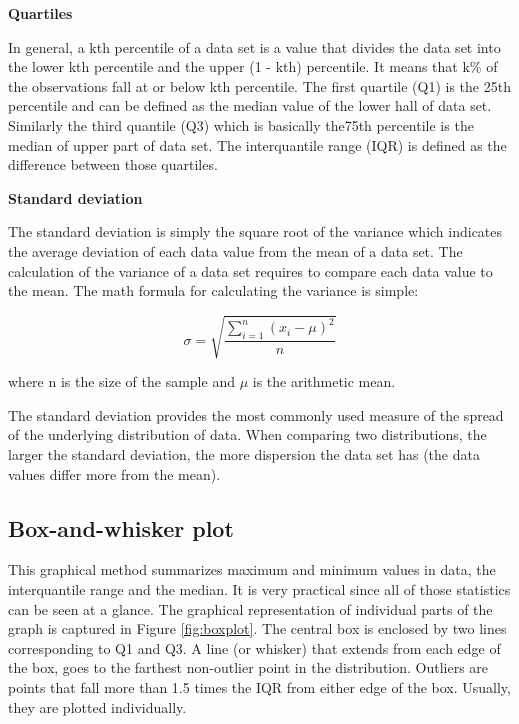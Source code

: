 \documentclass[a4paper,10pt,twoside]{article}
\begin{document}
 \smallskip
\noindent \textbf{Quartiles}
\smallskip

\noindent In general, a kth percentile of a data set is a value that divides the data set into the lower kth percentile and the upper (1 - kth) percentile. It means that k\% of the observations fall at or below kth percentile. The first quartile (Q1) is the 25th percentile and can be defined as the median value of the lower hall of data set. Similarly the third quantile (Q3) which is basically the75th percentile is the median of upper part of data set. The interquantile range (IQR) is defined as the difference between those quartiles.

\smallskip
\noindent \textbf{Standard deviation}
\smallskip

\noindent The standard deviation is simply the square root of the variance which indicates the average deviation of each data value from the mean of a data set. The calculation of the variance of a data set requires to compare each data value to the mean. The math formula for calculating the variance is simple:

$$
\sigma = \sqrt{\frac{\displaystyle\sum_{i=1}^{n}(x_i - \mu)^2} {n}}
$$

\noindent where n is the size of the sample and $\mu$ is the arithmetic mean.

The standard deviation provides the most commonly used measure of the spread of the underlying distribution of data. When comparing two distributions, the larger the standard deviation, the more dispersion the data set has (the data values differ more from the mean). 


\newpage
\vspace*{-1cm}
\subsection{Box-and-whisker plot}

\noindent This graphical method summarizes maximum and minimum values in data, the interquantile range and the median. It is very practical since all of those statistics can be seen at a glance. The graphical representation of individual parts of the graph is captured in Figure \ref{fig:boxplot}. The central box is enclosed by two lines corresponding to Q1 and Q3.  A line (or whisker) that extends from each edge of the box, goes to the farthest non-outlier point in the distribution. Outliers are points that fall more than 1.5 times the IQR from either edge of the box. Usually, they are plotted individually.
\end{document}
